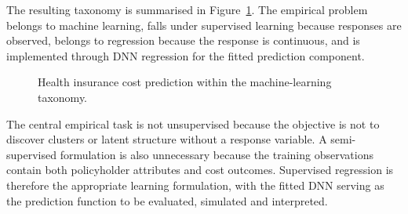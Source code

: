 \noindent
The resulting taxonomy is summarised in
Figure~\ref{fig:ml_family_tree}. The empirical problem belongs to machine
learning, falls under supervised learning because responses are observed,
belongs to regression because the response is continuous, and is implemented
through DNN regression for the fitted prediction component.

\begin{figure}[H]
  \centering
  \caption{Health insurance cost prediction within the machine-learning taxonomy.}
  \label{fig:ml_family_tree}
\end{figure}

\noindent
The central empirical task is not unsupervised because the objective is not to
discover clusters or latent structure without a response variable. A
semi-supervised formulation is also unnecessary because the training
observations contain both policyholder attributes and cost outcomes. Supervised
regression is therefore the appropriate learning formulation, with the fitted
DNN serving as the prediction function to be evaluated, simulated and
interpreted.
\newpage

